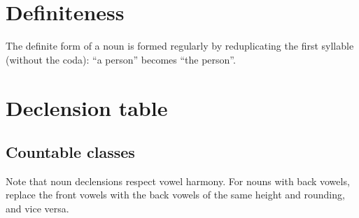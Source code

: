 \documentclass{book}
\begin{document}
\section{Definiteness}

The definite form of a noun is formed regularly by reduplicating the first syllable (without the coda):  ``a person'' becomes  ``the person''.

\section{Declension table}

\subsection{Countable classes}

Note that noun declensions respect vowel harmony. For nouns with back vowels, replace the front vowels with the back vowels of the same height and rounding, and vice versa.
\end{document}
